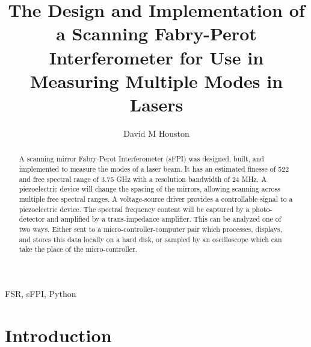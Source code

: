 \documentclass[12pt,journal]{IEEEtran}
\begin{document}
\title{The Design and Implementation of a Scanning Fabry-Perot Interferometer for Use in Measuring Multiple Modes in Lasers}

\author{David M Houston}

\maketitle

\begin{abstract}

A scanning mirror Fabry-Perot Interferometer (sFPI) was designed, built, and implemented to measure the modes of a laser beam. It has an estimated finesse of 522 and free spectral range of 3.75 GHz with a resolution bandwidth of 24 MHz. A piezoelectric device will change the spacing of the mirrors, allowing scanning across multiple free spectral ranges. A voltage-source driver provides a controllable signal to a piezoelectric device. The spectral frequency content will be captured by a photo-detector and amplified by a trans-impedance amplifier. This can be analyzed one of two ways. Either sent to a micro-controller-computer pair which processes, displays, and stores this data locally on a hard disk, or sampled by an oscilloscope which can take the place of the micro-controller.

\end{abstract}


\begin{IEEEkeywords}
FSR, sFPI, Python
\end{IEEEkeywords}


\section{Introduction} \label{ss:introduction}
\end{document}
